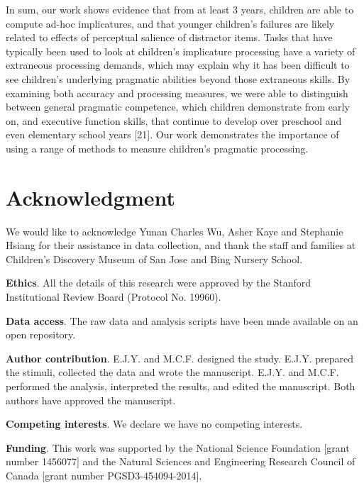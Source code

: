 \documentclass{rsos}
\begin{document}
In sum, our work shows evidence that from at least 3 years, children are
able to compute ad-hoc implicatures, and that younger children's
failures are likely related to effects of perceptual salience of
distractor items. Tasks that have typically been used to look at
children's implicature processing have a variety of extraneous
processing demands, which may explain why it has been difficult to see
children's underlying pragmatic abilities beyond those extraneous
skills. By examining both accuracy and processing measures, we were able
to distinguish between general pragmatic competence, which children
demonstrate from early on, and executive function skills, that continue
to develop over preschool and even elementary school years {[}21{]}. Our
work demonstrates the importance of using a range of methods to measure
children's pragmatic processing.



\section*{Acknowledgment}

We would like to acknowledge Yunan Charles Wu, Asher Kaye and Stephanie Hsiang for their assistance in data collection, and thank the staff and families at Children's Discovery Museum of San Jose and Bing Nursery School.

\vspace*{10pt}

\textbf{Ethics}. All the details of this research were approved by the Stanford Institutional Review Board (Protocol No. 19960).

\textbf{Data access}. The raw data and analysis scripts have been made available on an open repository.

\textbf{Author contribution}. E.J.Y. and M.C.F. designed the study. E.J.Y. prepared the stimuli, collected the data and wrote the manuscript. E.J.Y. and M.C.F. performed the analysis, interpreted the results, and edited the manuscript. Both authors have approved the manuscript.

\textbf{Competing interests}. We declare we have no competing interests.

\textbf{Funding}. This work was supported by the National Science Foundation {[}grant
number 1456077{]} and the Natural Sciences and Engineering Research
Council of Canada {[}grant number PGSD3-454094-2014{]}.
\end{document}
